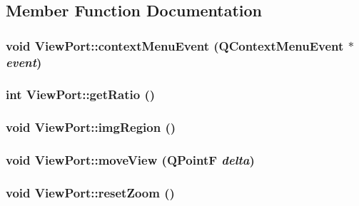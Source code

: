 \subsection{Member Function Documentation}
\hypertarget{classViewPort_af3c98b34c5ff602bd74c5b95425de4a9}{
\subsubsection[{contextMenuEvent}]{\setlength{\rightskip}{0pt plus 5cm}void ViewPort::contextMenuEvent (QContextMenuEvent $\ast$ {\em event})}}
\label{classViewPort_af3c98b34c5ff602bd74c5b95425de4a9}
\hypertarget{classViewPort_a969eb1a036822f1f500dd832c1f45d11}{
\subsubsection[{getRatio}]{\setlength{\rightskip}{0pt plus 5cm}int ViewPort::getRatio ()}}
\label{classViewPort_a969eb1a036822f1f500dd832c1f45d11}
\hypertarget{classViewPort_a60f919b3f7329bb5de060fa3befda08b}{
\subsubsection[{imgRegion}]{\setlength{\rightskip}{0pt plus 5cm}void ViewPort::imgRegion ()}}
\label{classViewPort_a60f919b3f7329bb5de060fa3befda08b}
\hypertarget{classViewPort_a3e318f428a0d0cc2e5c3835f1c77cc06}{
\subsubsection[{moveView}]{\setlength{\rightskip}{0pt plus 5cm}void ViewPort::moveView (QPointF {\em delta})}}
\label{classViewPort_a3e318f428a0d0cc2e5c3835f1c77cc06}
\hypertarget{classViewPort_af9e56726827ee1679b536d90586b3add}{
\subsubsection[{resetZoom}]{\setlength{\rightskip}{0pt plus 5cm}void ViewPort::resetZoom ()}}
